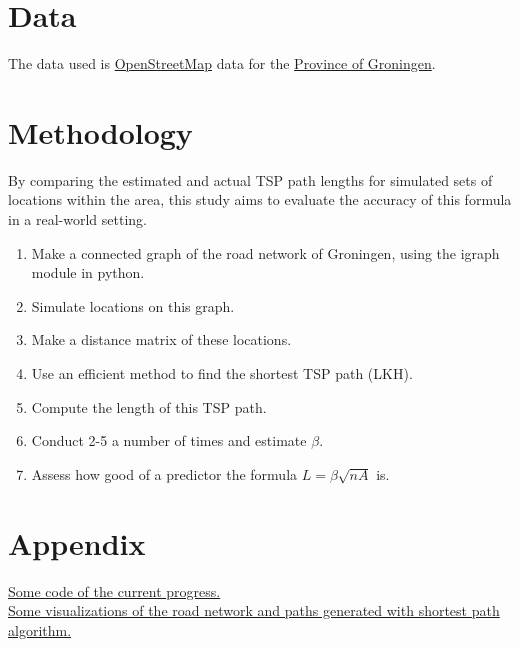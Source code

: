 \documentclass[a4paper,11pt]{article}
\newcommand{\1}[1]{\,I_{#1}} %
\begin{document}
\section{Data}
The data used is
\href{https://www.openstreetmap.org/#map=12/53.2184/6.5702}{OpenStreetMap}
data for the
\href{https://download.geofabrik.de/europe/netherlands/groningen.html}{Province
	of Groningen}.
\section{Methodology}
By comparing the estimated and actual TSP path lengths for simulated
sets of locations within the area, this study aims to evaluate the
accuracy of this formula in a real-world setting.
\begin{enumerate}
	\item Make a connected graph of the road network of Groningen,
	      using the igraph module in python.
	\item Simulate locations on this graph.
	\item Make a distance matrix of these locations.
	\item Use an efficient method to find the shortest TSP path (LKH).
	\item Compute the length of this TSP path.
	\item Conduct 2-5 a number of times and estimate $\beta$.
	\item Assess how good of a predictor the formula $L=\beta\sqrt{nA}$ is.
\end{enumerate}


\section{Appendix}
\href{https://github.com/koen1859/Scriptie}{Some code of the current
	progress.}\\
\href{https://koenstevens.nl/?page_id=182}{Some visualizations of the
	road network and paths generated with shortest path algorithm.}
\end{document}
